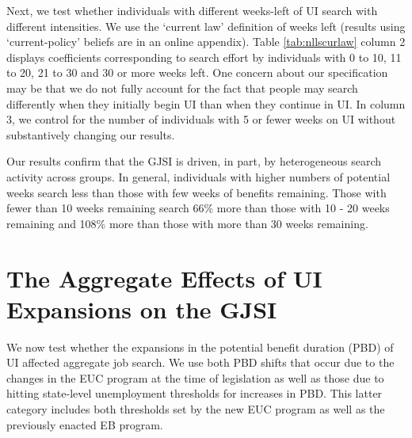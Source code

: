 \documentclass[12pt]{article}
\begin{document}
\begin{spacing}{2}
Next, we test whether individuals with different weeks-left of UI search with different intensities. We use the `current law' definition of weeks left (results using `current-policy' beliefs are in an online appendix). Table \ref{tab:nllscurlaw} column 2 displays coefficients corresponding to search effort by individuals with 0 to 10, 11 to 20, 21 to 30 and 30 or more weeks left. One concern about our specification may be that we do not fully account for the fact that people may search differently when they initially begin UI than when they continue in UI. In column 3, we control for the number of individuals with 5 or fewer weeks on UI without substantively changing our results.

Our results confirm that the GJSI is driven, in part, by heterogeneous search activity across groups. In general, individuals with higher numbers of potential weeks search less than those with few weeks of benefits remaining. Those with fewer than 10 weeks remaining search 66\% more than those with 10 - 20 weeks remaining and 108\% more than those with more than 30 weeks remaining.\footnotemark \




\section{The Aggregate Effects of UI Expansions on the GJSI}
We now test whether the expansions in the potential benefit duration (PBD) of UI affected aggregate job search. We use both PBD shifts that occur due to the changes in the EUC program at the time of legislation as well as those due to hitting state-level unemployment thresholds for increases in PBD. This latter category includes both thresholds set by the new EUC program as well as the previously enacted EB program. 


\end{spacing}
\end{document}
